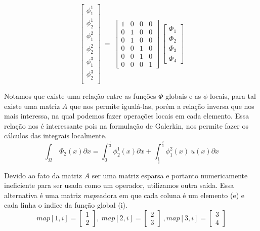\begin{equation}
\begin{bmatrix}
\phi_1^1\\[1.9pt] 
\phi_2^1\\[1.9pt]
\phi_1^2\\[1.9pt] 
\phi_2^2\\[1.9pt]
\phi_1^3\\[1.9pt] 
\phi_2^3\\[1.9pt] 
\end{bmatrix}\ = \
\begin{bmatrix}
1 &0  & 0 & 0 \\ 
0 & 1 & 0 & 0\\ 
0 & 1 & 0 & 0\\ 
0 &0  & 1 & 0\\ 
0 &0  & 1 & 0\\ 
0 &0  & 0 & 1
\end{bmatrix}\
\begin{bmatrix}
\Phi_1\\ 
\Phi_2\\ 
\Phi_3\\ 
\Phi_4
\end{bmatrix}
\end{equation}

Notamos que existe uma relação entre as funções  $\Phi$ globais e as $\phi$ locais, para tal existe uma matriz $A$ que nos permite igualá-las, porém a relação inversa que nos mais interessa, na qual podemos fazer operações locais em cada elemento. Essa relação nos é interessante pois na formulação de Galerkin, nos permite fazer os cálculos das integrais localmente.
\begin{equation}
\int_\Omega\ \Phi_2(x) \partial x = \int_{0}^{\frac{1}{3}} \phi^1_2(x) \partial x + \int_{\frac{1}{3}}^{\frac{2}{3}} \phi^2_1(x)\ u(x) \partial x
\end{equation}

Devido ao fato da matriz $A$ ser uma matriz esparsa e portanto numericamente ineficiente para ser usada como um operador, utilizamos outra saída. Essa alternativa é uma matriz \emph{map}eadora em que cada coluna é um elemento (e) e cada linha o indice da função global (i).
\begin{equation}
map[1,i]= \begin{bmatrix}
1\\
2
\end{bmatrix},\
map[2,i]= \begin{bmatrix}
2\\
3
\end{bmatrix}\
,map[3,i]= \begin{bmatrix}
3\\
4
\end{bmatrix}
\end{equation}

